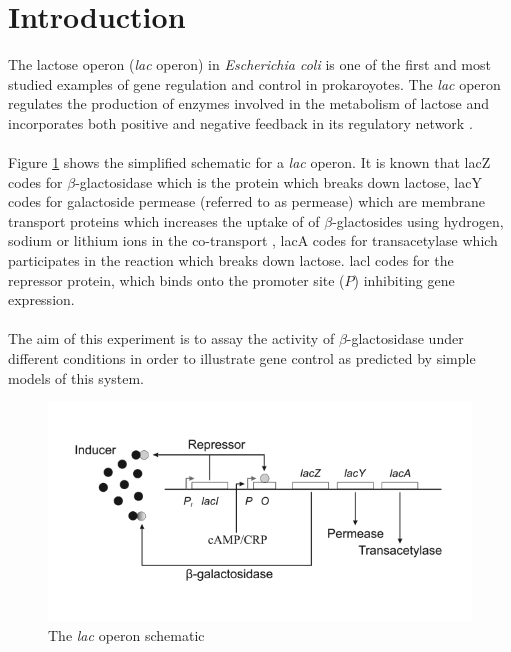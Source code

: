\documentclass{article}
\begin{document}
\section{Introduction}
The lactose operon (\textit{lac} operon) in \textit{Escherichia coli} is one of the first and most studied examples of gene regulation and control in prokaroyotes. The \textit{lac} operon regulates the production of enzymes involved in the metabolism of lactose and incorporates both positive and negative feedback in its regulatory network \cite{goossens93}. \\ \\
Figure \ref{fig:lac_operon} shows the simplified schematic for a \textit{lac} operon. It is known that lacZ codes for $\beta$-glactosidase which is the protein which breaks down lactose, lacY codes for galactoside permease (referred to as permease) which are membrane transport proteins which increases the uptake of of $\beta$-glactosides using hydrogen, sodium or lithium ions in the co-transport \cite{permease}, lacA codes for transacetylase which participates in the reaction which breaks down lactose. lacl codes for the repressor protein, which binds onto the promoter site ($P$) inhibiting gene expression. \\ \\
The aim of this experiment is to assay the activity of $\beta$-glactosidase under different conditions in order to illustrate gene control as predicted by simple models of this system.
\begin{figure}[htp]
	\centering
	\includegraphics[width=0.8\linewidth]{lac.png}
	\caption{The \textit{lac} operon schematic}
	\label{fig:lac_operon}
\end{figure}
\end{document}
